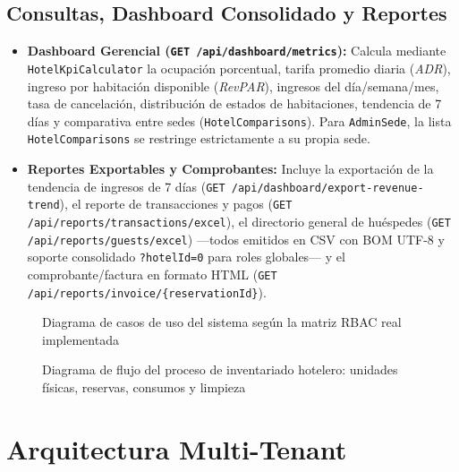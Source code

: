 \documentclass[12pt,a4paper]{article}
\begin{document}
\subsection{Consultas, Dashboard Consolidado y Reportes}
\begin{itemize}
    \item \textbf{Dashboard Gerencial (\texttt{GET /api/dashboard/metrics}):} Calcula mediante \texttt{HotelKpiCalculator} la ocupaci\'on porcentual, tarifa promedio diaria (\textit{ADR}), ingreso por habitaci\'on disponible (\textit{RevPAR}), ingresos del d\'ia/semana/mes, tasa de cancelaci\'on, distribuci\'on de estados de habitaciones, tendencia de 7 d\'ias y comparativa entre sedes (\texttt{HotelComparisons}). Para \texttt{AdminSede}, la lista \texttt{HotelComparisons} se restringe estrictamente a su propia sede.
    \item \textbf{Reportes Exportables y Comprobantes:} Incluye la exportaci\'on de la tendencia de ingresos de 7 d\'ias (\texttt{GET /api/dashboard/export-revenue-trend}), el reporte de transacciones y pagos (\texttt{GET /api/reports/transactions/excel}), el directorio general de hu\'espedes (\texttt{GET /api/reports/guests/excel}) ---todos emitidos en CSV con BOM UTF-8 y soporte consolidado \texttt{?hotelId=0} para roles globales--- y el comprobante/factura en formato HTML (\texttt{GET /api/reports/invoice/\{reservationId\}}).
\end{itemize}

\begin{figure}[H]
    \centering
    
    \caption{Diagrama de casos de uso del sistema seg\'un la matriz RBAC real implementada}
    \label{fig:casos_de_uso}
\end{figure}

\begin{figure}[H]
    \centering
    
    \caption{Diagrama de flujo del proceso de inventariado hotelero: unidades f\'isicas, reservas, consumos y limpieza}
    \label{fig:flujo_inventariado}
\end{figure}

\section{Arquitectura Multi-Tenant}
\end{document}
